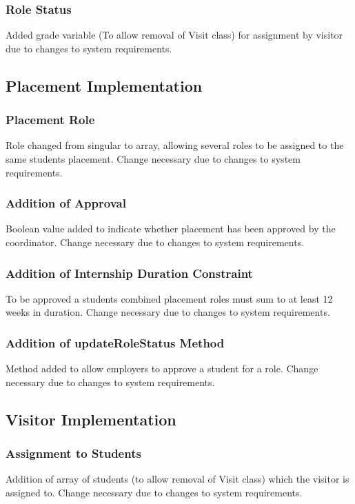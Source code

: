 \documentclass{l3deliverable}
\begin{document}
\subsubsection{Role Status}
Added grade variable (To allow removal of Visit class) for assignment by visitor due to changes to system requirements.

\subsection{Placement Implementation}

\subsubsection{Placement Role}
Role changed from singular to array, allowing several roles to be assigned to the same students placement. Change necessary due to changes to system requirements.

\subsubsection{Addition of Approval}
Boolean value added to indicate whether placement has been approved by the coordinator. Change necessary due to changes to system requirements.

\subsubsection{Addition of Internship Duration Constraint}
To be approved a students combined placement roles must sum to at least 12 weeks in duration. Change necessary due to changes to system requirements.

\subsubsection{Addition of updateRoleStatus Method}
Method added to allow employers to approve a student for a role. Change necessary due to changes to system requirements.

\subsection{Visitor Implementation}

\subsubsection{Assignment to Students}
Addition of array of students (to allow removal of Visit class) which the visitor is assigned to. Change necessary due to changes to system requirements.
\end{document}

